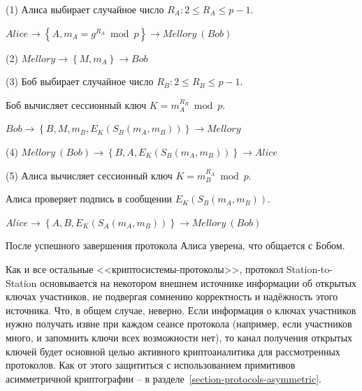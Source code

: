 \begin{protocol}
    \item[(1)] Алиса выбирает случайное число $R_A: 2 \leq R_A \leq p-1$.
    \item[{}] $Alice \to \left\{ A, m_A = g^{R_A} \bmod p \right\} \to Mellory~(Bob)$

    \item[(2)] $Mellory \to \left\{ M, m_A \right\} \to Bob$

    \item[(3)] Боб выбирает случайное число $R_B: 2 \leq R_B \leq p-1$.
    \item[{}] Боб вычисляет сессионный ключ $K = m_A^{R_B} \bmod p$.
    \item[{}] $Bob \to \left\{ B, M, m_B, E_K( S_B ( m_A, m_B )) \right\} \to Mellory$

    \item[(4)] $Mellory~(Bob) \to \left\{ B, A, E_K( S_B ( m_A, m_B )) \right\} \to Alice$

    \item[(5)] Алиса вычисляет сессионный ключ $K = m_B^{R_A} \bmod p$.
    \item[{}] Алиса проверяет подпись в сообщении $E_K( S_B ( m_A, m_B ))$.
    \item[{}] $Alice \to \left\{ A, B, E_K( S_A ( m_A, m_B ) ) \right\} \to Mellory~(Bob)$
\end{protocol}

После успешного завершения протокола Алиса уверена, что общается с Бобом.

Как и все остальные <<криптосистемы-протоколы>>, протокол Station-to-Station основывается на некотором внешнем источнике информации об открытых ключах участников, не подвергая сомнению корректность и надёжность этого источника. Что, в общем случае, неверно. Если информация о ключах участников нужно получать извне при каждом сеансе протокола (например, если участников много, и запомнить ключи всех возможности нет), то канал получения открытых ключей будет основной целью активного криптоаналитика для рассмотренных протоколов. Как от этого защититься с использованием примитивов асимметричной криптографии -- в разделе~\ref{section-protocols-asymmetric}.

